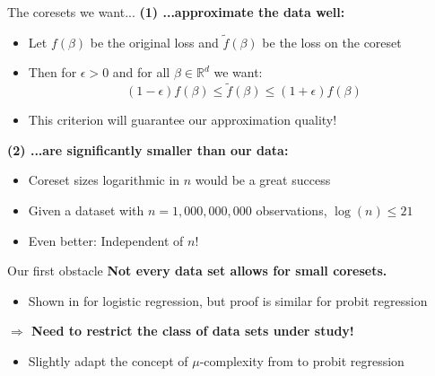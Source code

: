 \documentclass[gray]{beamer}
\begin{document}
\begin{frame}{The coresets we want...} \pause
    \textbf{(1) ...approximate the data well:}
    \begin{itemize}
        \item Let $f(\beta)$ be the original loss and $\tilde{f}(\beta)$
              be the loss on the coreset
        \item Then for $\epsilon > 0$ and for all $\beta \in \mathbb{R}^d$ we want:
              \begin{equation*}
                  (1 - \epsilon) f(\beta) \leq \tilde{f}(\beta) \leq (1 + \epsilon) f(\beta)
              \end{equation*}
        \item This criterion will guarantee our approximation quality!
    \end{itemize}

    \pause

    \vspace{\fill}

    \textbf{(2) ...are significantly smaller than our data:}
    \begin{itemize}
        \item Coreset sizes logarithmic in $n$ would be a great success
        \item Given a dataset with $n=1,000,000,000$ observations,
              $\log(n) \leq 21$
        \item Even better: Independent of $n$!
    \end{itemize}
\end{frame}

\begin{frame}{Our first obstacle} \pause
    \textbf{Not every data set allows for small coresets.}
    \begin{itemize}
        \item Shown in \cite{on-coresets} for logistic regression,
              but proof is similar for probit regression
    \end{itemize}

    \pause

    \vspace{\fill}

    \textbf{$\Rightarrow$ Need to restrict the class of data sets under study!}
    \begin{itemize}
        \item Slightly adapt the concept of $\mu$-complexity from
              \cite{on-coresets} to probit regression
    \end{itemize}
\end{frame}
\end{document}
